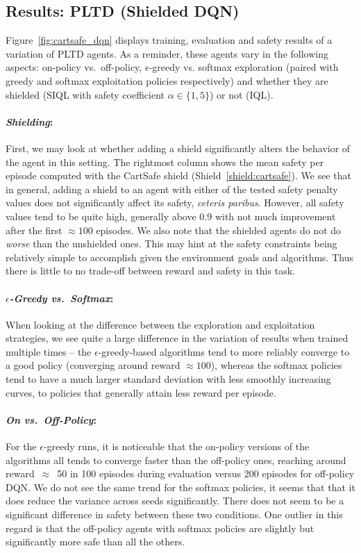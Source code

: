 \subsection{Results: PLTD (Shielded DQN)}

Figure~\ref{fig:cartsafe_dqn} displays training, evaluation and safety results of a variation of PLTD agents. As a reminder, these agents vary in the following aspects: on-policy vs.\ off-policy, $\epsilon$-greedy vs. softmax exploration (paired with greedy and softmax exploitation policies respectively) and whether they are shielded (SIQL with safety coefficient $\alpha\in\{1,5\}$) or not (IQL).

\paragraph{\textit{Shielding}:} First, we may look at whether adding a shield significantly alters the behavior of the agent in this setting. The rightmost column shows the mean safety per episode computed with the CartSafe shield (Shield~\ref{shield:cartsafe}). We see that in general, adding a shield to an agent with either of the tested safety penalty values does not significantly affect its safety, \textit{ceteris paribus}. However, all safety values tend to be quite high, generally above 0.9 with not much improvement after the first $\approx100$ episodes. We also note that the shielded agents do not do \textit{worse} than the unshielded ones. This may hint at the safety constraints being relatively simple to accomplish given the environment goals and algorithms. Thus there is little to no trade-off between reward and safety in this task.

\paragraph{\textit{$\epsilon$-Greedy vs.\ Softmax}:} When looking at the difference between the exploration and exploitation strategies, we see quite a large difference in the variation of results when trained multiple times -- the $\epsilon$-greedy-based algorithms tend to more reliably converge to a good policy (converging around reward $\approx100$), whereas the softmax policies tend to have a much larger standard deviation with less smoothly increasing curves, to policies that generally attain less reward per episode.

\paragraph{\textit{On vs.\ Off-Policy}:} For the $\epsilon$-greedy runs, it is noticeable that the on-policy versions of the algorithms all tends to converge faster than the off-policy ones, reaching around reward~$\approx$~50 in 100 episodes during evaluation versus 200 episodes for off-policy DQN. We do not see the same trend for the softmax policies, it seems that that it does reduce the variance across seeds significantly. There does not seem to be a significant difference in safety between these two conditions. One outlier in this regard is that the off-policy agents with softmax policies are slightly but significantly more safe than all the others.

